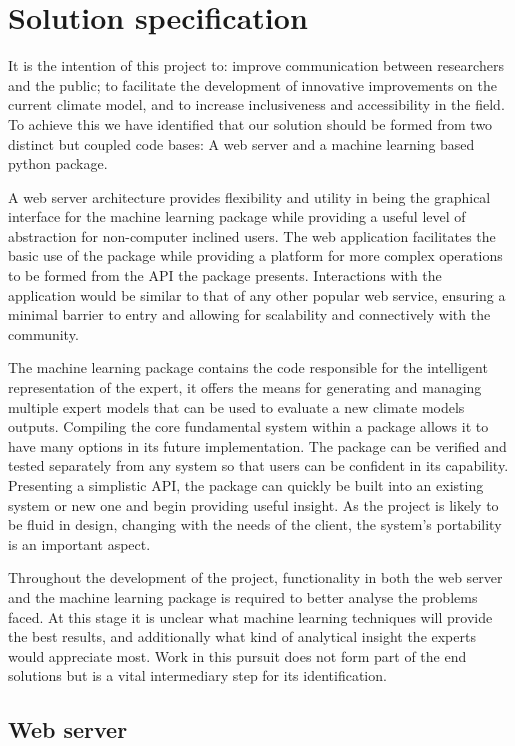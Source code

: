 \documentclass{ecmm427_assignment}
\begin{document}
\section{Solution specification}

 It is the intention of this project to: improve communication between researchers and the public; to facilitate the development of innovative improvements on the current climate model, and to increase inclusiveness and accessibility in the field. To achieve this we have identified that our solution should be formed from two distinct but coupled code bases: A web server and a machine learning based python package.

 A web server architecture provides flexibility and utility in being the graphical interface for the machine learning package while providing a useful level of abstraction for non-computer inclined users. The web application facilitates the basic use of the package while providing a platform for more complex operations to be formed from the API the package presents. Interactions with the application would be similar to that of any other popular web service, ensuring a minimal barrier to entry and allowing for scalability and connectively with the community.

 The machine learning package contains the code responsible for the intelligent representation of the expert, it offers the means for generating and managing multiple expert models that can be used to evaluate a new climate models outputs. Compiling the core fundamental system within a package allows it to have many options in its future implementation. The package can be verified and tested separately from any system so that users can be confident in its capability. Presenting a simplistic API, the package can quickly be built into an existing system or new one and begin providing useful insight. As the project is likely to be fluid in design, changing with the needs of the client, the system's portability is an important aspect.

 Throughout the development of the project, functionality in both the web server and the machine learning package is required to better analyse the problems faced. At this stage it is unclear what machine learning techniques will provide the best results, and additionally what kind of analytical insight the experts would appreciate most. Work in this pursuit does not form part of the end solutions but is a vital intermediary step for its identification.

\subsection{Web server}
\end{document}
